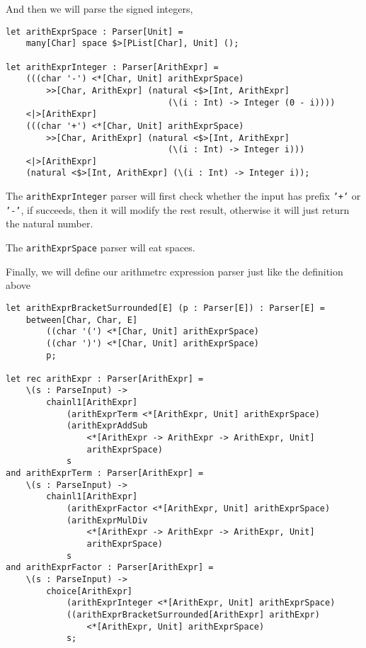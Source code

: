 And then we will parse the signed integers,

\begin{lstlisting}
let arithExprSpace : Parser[Unit] =
    many[Char] space $>[PList[Char], Unit] ();

let arithExprInteger : Parser[ArithExpr] =
    (((char '-') <*[Char, Unit] arithExprSpace)
        >>[Char, ArithExpr] (natural <$>[Int, ArithExpr]
                                (\(i : Int) -> Integer (0 - i))))
    <|>[ArithExpr]
    (((char '+') <*[Char, Unit] arithExprSpace)
        >>[Char, ArithExpr] (natural <$>[Int, ArithExpr]
                                (\(i : Int) -> Integer i)))
    <|>[ArithExpr]
    (natural <$>[Int, ArithExpr] (\(i : Int) -> Integer i));
\end{lstlisting}

The \texttt{arithExprInteger} parser will first check whether the input has prefix \texttt{'+'} or \texttt{'-'}, if succeeds, then it will modify the rest result, otherwise it will just return the natural number.

The \texttt{arithExprSpace} parser will eat spaces.

Finally, we will define our arithmetrc expression parser just like the definition above

\begin{lstlisting}
let arithExprBracketSurrounded[E] (p : Parser[E]) : Parser[E] =
    between[Char, Char, E]
        ((char '(') <*[Char, Unit] arithExprSpace)
        ((char ')') <*[Char, Unit] arithExprSpace)
        p;

let rec arithExpr : Parser[ArithExpr] =
    \(s : ParseInput) ->
        chainl1[ArithExpr]
            (arithExprTerm <*[ArithExpr, Unit] arithExprSpace)
            (arithExprAddSub
                <*[ArithExpr -> ArithExpr -> ArithExpr, Unit]
                arithExprSpace)
            s
and arithExprTerm : Parser[ArithExpr] =
    \(s : ParseInput) ->
        chainl1[ArithExpr]
            (arithExprFactor <*[ArithExpr, Unit] arithExprSpace)
            (arithExprMulDiv
                <*[ArithExpr -> ArithExpr -> ArithExpr, Unit]
                arithExprSpace)
            s
and arithExprFactor : Parser[ArithExpr] =
    \(s : ParseInput) ->
        choice[ArithExpr]
            (arithExprInteger <*[ArithExpr, Unit] arithExprSpace)
            ((arithExprBracketSurrounded[ArithExpr] arithExpr)
                <*[ArithExpr, Unit] arithExprSpace)
            s;
\end{lstlisting}


